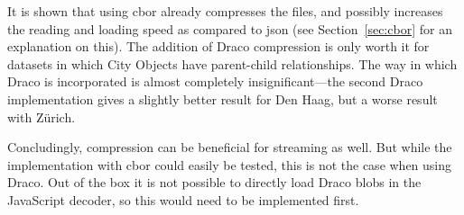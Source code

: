 It is shown that using \ac{cbor} already compresses the files, and possibly increases the reading and loading speed as compared to \ac{json} (see Section~\ref{sec:cbor} for an explanation on this).
The addition of Draco compression is only worth it for datasets in which City Objects have parent-child relationships.
The way in which Draco is incorporated is almost completely insignificant---the second Draco implementation gives a slightly better result for Den Haag, but a worse result with Zürich.

Concludingly, compression can be beneficial for streaming as well.
But while the implementation with \ac{cbor} could easily be tested, this is not the case when using Draco.
Out of the box it is not possible to directly load Draco \ac{blob}s in the JavaScript decoder, so this would need to be implemented first.
